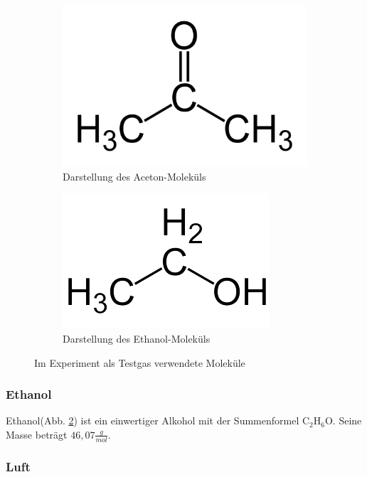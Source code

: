 \documentclass[10pt,a4paper]{article}
\begin{document}
\begin{figure}[h]
	\centering
	\begin{subfigure}{0.45\textwidth}
		\centering
		\includegraphics[scale = 0.15]{aceton.png}
		\caption{Darstellung des Aceton-Moleküls}
		\label{aceton1}
	\end{subfigure}
	\begin{subfigure}{0.45\textwidth}
		\centering
		\includegraphics[scale = 0.5]{ethanol.png}
		\caption{Darstellung des Ethanol-Moleküls}
		\label{ethanol1}
	\end{subfigure}
	\caption{Im Experiment als Testgas verwendete Moleküle}
	\label{proben1}
\end{figure}

\subsubsection{Ethanol}

Ethanol(Abb. \ref{ethanol1}) ist ein einwertiger Alkohol mit der Summenformel C$_2$H$_6$O. Seine Masse beträgt $46,07 \frac{g}{mol}$.

\subsubsection{Luft}
\end{document}
